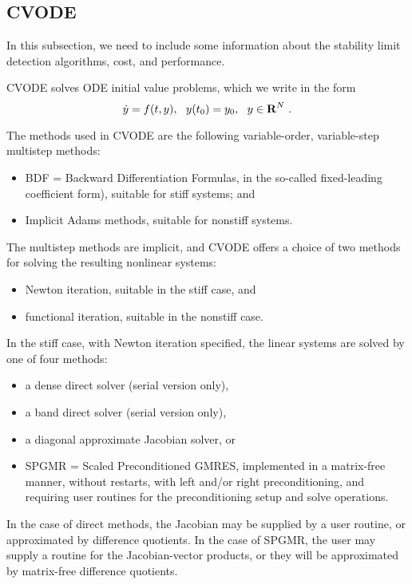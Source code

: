 \subsection{CVODE}

{\sf In this subsection, we need to include some information about the stability limit detection algorithms, cost, and performance.}

CVODE solves ODE initial value problems, which we write in the form
\[ \dot{y} = f(t,y),~~ y(t_0) = y_0,~~ y \in \mbox{\bf R}^N ~. \]

The methods used in CVODE are the following variable-order,
variable-step multistep methods:
\vspace*{-.19in}
\begin{itemize}
\item BDF = Backward Differentiation Formulas, in the so-called
fixed-leading coefficient form), suitable for stiff systems; and
\item Implicit Adams methods, suitable for nonstiff systems.
\end{itemize}

The multistep methods are implicit, and CVODE offers a choice of two
methods for solving the resulting nonlinear systems:
\vspace*{-.19in}
\begin{itemize}
\item Newton iteration, suitable in the stiff case, and
\item functional iteration, suitable in the nonstiff case.
\end{itemize}

In the stiff case, with Newton iteration specified, the linear systems
are solved by one of four methods:
\vspace*{-.19in}
\begin{itemize}
\item a dense direct solver (serial version only),
\item a band direct solver (serial version only),
\item a diagonal approximate Jacobian solver, or
\item SPGMR = Scaled Preconditioned GMRES, implemented in a
matrix-free manner, without restarts, with left and/or right
preconditioning, and requiring user routines for the preconditioning
setup and solve operations.

\end{itemize}

In the case of direct methods, the Jacobian may be supplied by a user
routine, or approximated by difference quotients.  In the case of
SPGMR, the user may supply a routine for the Jacobian-vector products,
or they will be approximated by matrix-free difference quotients.


